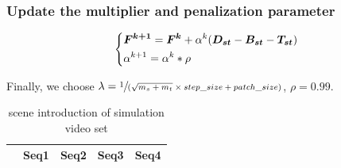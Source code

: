\documentclass[journal]{IEEEtran}
\begin{document}
\subsubsection{Update the multiplier and penalization parameter}
\begin{equation}
  \begin{dcases}
    \bm{F^{k+1}}=\bm{F^{k}}+\alpha^{k}(\bm{D_{st}}-\bm{B_{st}}-\bm{T_{st}})\\
    \alpha^{k+1}=\alpha^{k} \ast \rho
  \end{dcases}
\end{equation}

Finally, we choose $\lambda=\sfrac{1}{(\sqrt{m_s+m_t}\times step\_size + patch\_size)}$, $\rho=0.99$.



\begin{table}[t]
  \centering
  \caption{scene introduction of simulation video set}
  \label{tab1}
  \begin{tabular}{|c|m{3cm}<{\centering}|m{3cm}<{\centering}|m{3cm}<{\centering}|m{3.2cm}<{\centering}|}
    \hline
    &Seq1 &Seq2 &Seq3 &Seq4\\
    \hline

\end{tabular}
\end{table}
\end{document}
